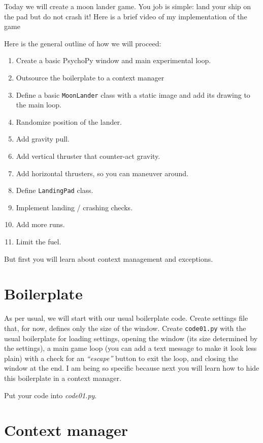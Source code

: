 \documentclass[
]{book}
\providecommand{\tightlist}{%
  \setlength{\itemsep}{0pt}\setlength{\parskip}{0pt}}
\begin{document}
Today we will create a moon lander game. You job is simple: land your ship on the pad but do not crash it! Here is a brief video of my implementation of the game

Here is the general outline of how we will proceed:

\begin{enumerate}
\def\labelenumi{\arabic{enumi}.}
\tightlist
\item
  Create a basic PsychoPy window and main experimental loop.
\item
  Outsource the boilerplate to a context manager
\item
  Define a basic \texttt{MoonLander} class with a static image and add its drawing to the main loop.
\item
  Randomize position of the lander.
\item
  Add gravity pull.
\item
  Add vertical thruster that counter-act gravity.
\item
  Add horizontal thrusters, so you can maneuver around.
\item
  Define \texttt{LandingPad} class.
\item
  Implement landing / crashing checks.
\item
  Add more runs.
\item
  Limit the fuel.
\end{enumerate}

But first you will learn about context management and exceptions.

\hypertarget{boilerplate-1}{%
\section{Boilerplate}\label{boilerplate-1}}

As per usual, we will start with our usual boilerplate code. Create settings file that, for now, defines only the size of the window. Create \texttt{code01.py} with the usual boilerplate for loading settings, opening the window (its size determined by the settings), a main game loop (you can add a text message to make it look less plain) with a check for an \emph{``escape''} button to exit the loop, and closing the window at the end. I am being so specific because next you will learn how to hide this boilerplate in a context manager.

Put your code into \emph{code01.py}.

\hypertarget{context-manager}{%
\section{Context manager}\label{context-manager}}
\end{document}
